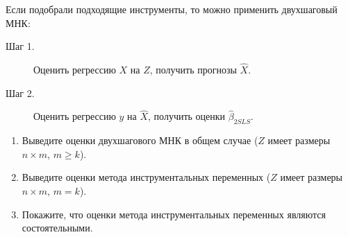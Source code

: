 \documentclass[10pt, a4paper]{extarticle}
\renewcommand{\ge}{\geqslant}
\begin{document}
	Если подобрали подходящие инструменты, то можно применить двухшаговый МНК:
	\begin{description}
		\item[Шаг 1.] Оценить регрессию $X$ на $Z$, получить прогнозы $\hat{X}$.
		\item[Шаг 2.] Оценить регрессию $y$ на $\hat{X}$, получить оценки $\hat{\beta}_{2SLS}$.
	\end{description}

	\begin{enumerate}[label=\alph*)]
		\item Выведите оценки двухшагового МНК в общем случае ($Z$ имеет размеры $n\times m$, $m \ge k$).
		\item Выведите оценки метода инструментальных переменных ($Z$ имеет размеры $n\times m$, $m = k$).
		\item Покажите, что оценки метода инструментальных переменных являются состоятельными.
	\end{enumerate}
	
\end{document}
